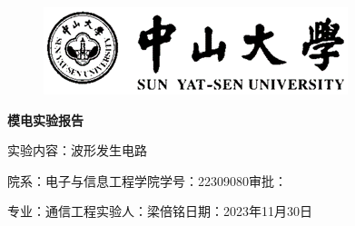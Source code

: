 \documentclass[a4paper,10pt,notitlepage]{article}
\begin{document}
	\large
	\onehalfspacing
	\begin{figure}[h]
		\raggedright
		\includegraphics{1.png}
	\end{figure}
	\centering
	{\Huge\textbf{模电实验报告}\par}
	\vspace{0.2cm}
	{\huge{实验内容：波形发生电路}\par}
	\raggedright
	\vspace{0.3cm}
	\begin{centering}
		{\large 院系：电子与信息工程学院\hfill 学号：22309080\hfill 审批：\hspace{2cm} \par
			专业：通信工程\hfill 实验人：梁倍铭\hfill 日期：2023年11月30日 \par}
	\end{centering}
	\vspace{0.3cm}
\end{document}
